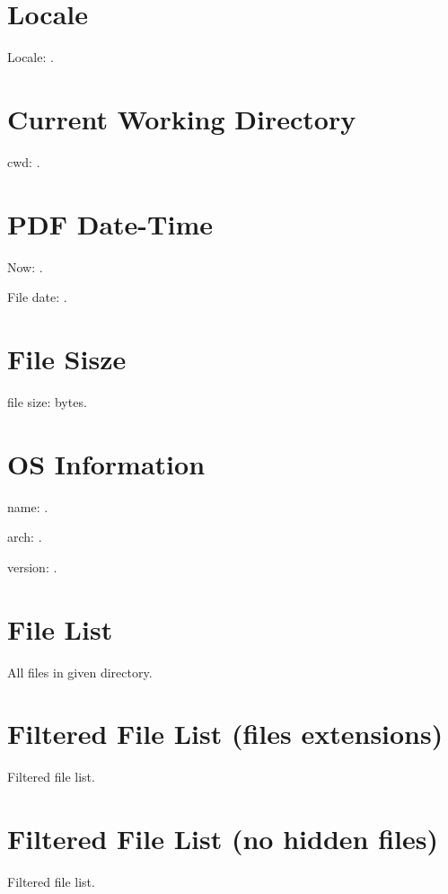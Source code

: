 \documentclass{article}
\begin{document}
\section{Locale}

\TeXOSQueryLocale{\result}
Locale: \texttt{\result}.

\section{Current Working Directory}

\TeXOSQueryCwd{\result}
cwd: \texttt{\result}.

\section{PDF Date-Time}
\TeXOSQueryNow{\result}
Now: \texttt{\result}.

File date: \texttt{\result}.

\section{File Sisze}

file size: \result bytes.

\section{OS Information}

\TeXOSQueryName{\result}
name: \result.

\TeXOSQueryArch{\result}
arch: \result.

\TeXOSQueryVersion{\result}
version: \result.

\section{File List}

All files in given directory.

\renewcommand{\do}[1]{\texttt{#1}.\par}

\expandafter\docsvlist\expandafter{\result}

\section{Filtered File List (files extensions)}

Filtered file list.

\expandafter\docsvlist\expandafter{\result}

\section{Filtered File List (no hidden files)}

Filtered file list.

\expandafter\docsvlist\expandafter{\result}
\end{document}

